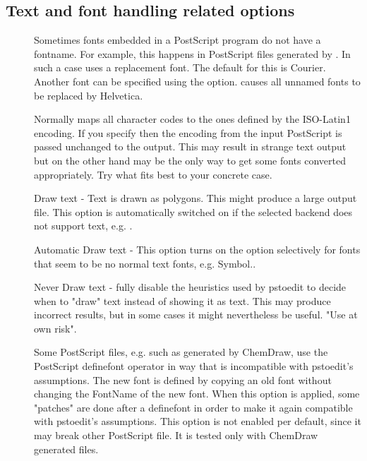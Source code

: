 \documentclass[english,a4paper]{article}
\begin{document}
\subsection{Text and font handling related options}
\begin{description}
\item[] 
 Sometimes fonts embedded in a PostScript program do not have a fontname. For example, this happens in PostScript files generated by . In such a case  uses a replacement font. The default for this is Courier. Another font can be specified using the  option.  causes all unnamed fonts to be replaced by Helvetica. 


\item[] 
Normally  maps all character codes to the ones defined by the ISO-Latin1 encoding. If you specify  then the encoding from the input PostScript is passed unchanged to the output. This may result in strange text output but on the other hand may be the only way to get some fonts converted appropriately. Try what fits best to your concrete case. 


\item[] 
Draw text - Text is drawn as polygons. This might produce a large output file. This option is automatically switched on if the selected backend does not support text, e.g. .


\item[] 
Automatic Draw text - This option turns on the  option selectively for fonts that seem to be no normal text fonts, e.g. Symbol..


\item[] 
Never Draw text -  fully disable the heuristics used by pstoedit to decide when to "draw" text instead of showing it as text. This may produce incorrect results, but in some cases it might nevertheless be useful. "Use at own risk". 


\item[] 
Some PostScript files, e.g. such as generated by ChemDraw, use the PostScript definefont operator in way that is incompatible with pstoedit's assumptions. The new font is defined by copying an old font without changing the FontName of the new font. When this option is applied, some "patches" are done after a definefont in order to make it again compatible with pstoedit's assumptions. This option is not enabled per default, since it may break other PostScript file. It is tested only with ChemDraw generated files.



\end{description}
\end{document}
